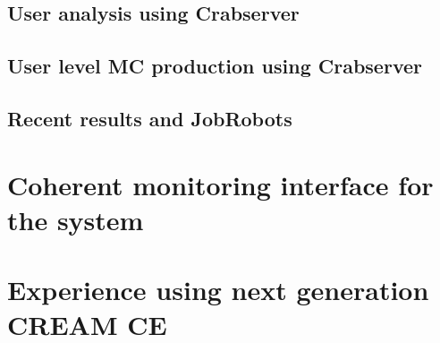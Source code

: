 \documentclass[a4paper]{jpconf}
\begin{document}
\subsection{User analysis using Crabserver}



\subsection{User level MC production using Crabserver}



\subsection{Recent results and JobRobots}



\section{Coherent monitoring interface for the system}



\section{Experience using next generation CREAM CE}
\end{document}
